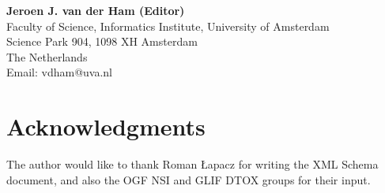 \documentclass[12pt]{article}  %
\begin{document}
% 
% 
% 

\textbf{Jeroen J. van der Ham (Editor)} \\
Faculty of Science, Informatics Institute, University of Amsterdam \\
Science Park 904, 1098 XH  Amsterdam  \\
The Netherlands \\
Email: vdham@uva.nl \\
\section{Acknowledgments}

The author would like to thank Roman Łapacz for writing the XML Schema document, and also the OGF NSI and GLIF DTOX groups for their input.


 
 

\pagebreak
\appendix
	
	
\end{document}

